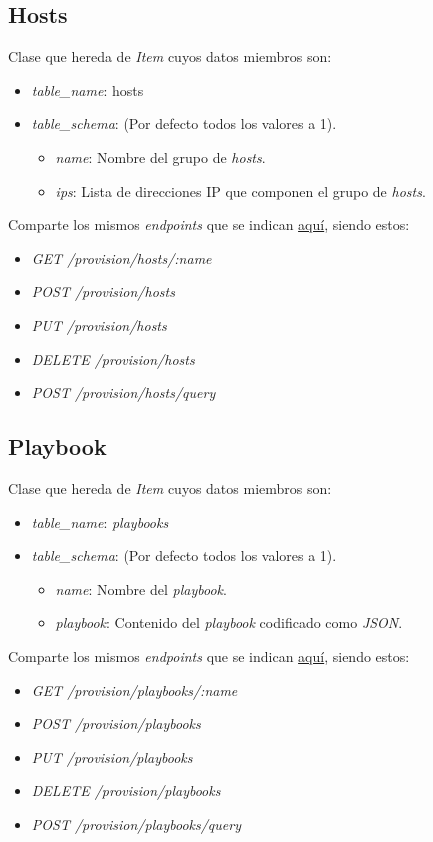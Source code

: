 \subsection{Hosts}

Clase que hereda de \textit{Item} cuyos datos miembros son:
\begin{itemize}
	\item \textit{table\_name}: hosts
	\item \textit{table\_schema}: (Por defecto todos los valores a 1).
	\begin{itemize}
		\item \textit{name}: Nombre del grupo de \textit{hosts}.
		\item \textit{ips}: Lista de direcciones IP que componen el grupo de \textit{hosts}.
	\end{itemize}
\end{itemize}
	
\bigskip
Comparte los mismos \textit{endpoints} que se indican \hyperref[sec:servicios]{aquí}, siendo estos:
\begin{itemize}
	\item \textit{GET /provision/hosts/:name}
	\item \textit{POST /provision/hosts}
	\item \textit{PUT /provision/hosts}
	\item \textit{DELETE /provision/hosts}
	\item \textit{POST /provision/hosts/query}
\end{itemize}


\subsection{Playbook}

Clase que hereda de \textit{Item} cuyos datos miembros son:
\begin{itemize}
	\item \textit{table\_name}: \textit{playbooks}
	\item \textit{table\_schema}: (Por defecto todos los valores a 1).
	\begin{itemize}
		\item \textit{name}: Nombre del \textit{playbook}.
		\item \textit{playbook}: Contenido del \textit{playbook} codificado como \textit{JSON}.
	\end{itemize}
\end{itemize}
	
\bigskip
Comparte los mismos \textit{endpoints} que se indican \hyperref[sec:servicios]{aquí}, siendo estos:
\begin{itemize}
	\item \textit{GET /provision/playbooks/:name}
	\item \textit{POST /provision/playbooks}
	\item \textit{PUT /provision/playbooks}
	\item \textit{DELETE /provision/playbooks}
	\item \textit{POST /provision/playbooks/query}
\end{itemize}

